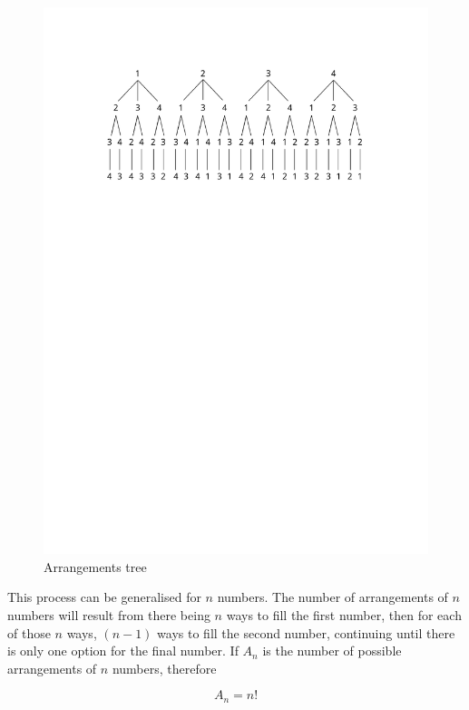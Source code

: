 \documentclass[a5paper]{article}
\begin{document}
\begin{figure}[ht]

  \begin{center}
    \includegraphics{arrangements}
  \end{center}
  \caption{Arrangements tree}
  \label{fig:1}
\end{figure}

This process can be generalised for $n$ numbers. The number of arrangements of
$n$ numbers will result from there being $n$ ways to fill the first number, then
for each of those $n$ ways, $(n-1)$ ways to fill the second number, continuing
until there is only one option for the final number. If $A_n$ is the number of
possible arrangements of $n$ numbers, therefore

\begin{equation}
  A_n = n!
\end{equation}
\end{document}
